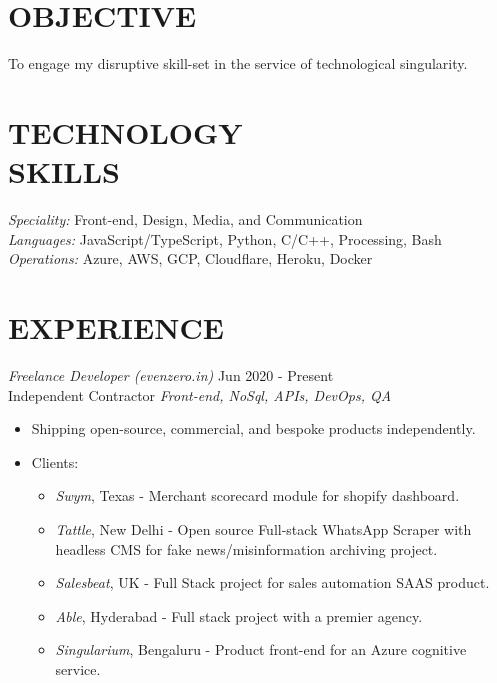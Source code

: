 \documentclass[margin, 10pt]{res} %
\begin{document}
\begin{resume}

\section{OBJECTIVE}  
To engage my disruptive skill-set in the service of technological singularity.

\section{TECHNOLOGY \\ SKILLS} 

{\sl Speciality:} Front-end, Design, Media, and Communication \\
{\sl Languages:} JavaScript/TypeScript, Python, C/C++, Processing, Bash\\
{\sl Operations:} Azure, AWS, GCP, Cloudflare, Heroku, Docker


\section{EXPERIENCE}

{\sl Freelance Developer (evenzero.in)} \hfill Jun 2020 - Present \\
 Independent Contractor \hfill {\scriptsize \it Front-end, NoSql, APIs, DevOps, QA}
\begin{itemize}
\item Shipping open-source, commercial, and bespoke products independently.
\item Clients:
\begin{itemize}
\item {\sl Swym}, Texas - Merchant scorecard module for shopify dashboard.
\item {\sl Tattle}, New Delhi - Open source Full-stack WhatsApp Scraper with headless CMS for fake news/misinformation archiving project. 
\item {\sl Salesbeat}, UK - Full Stack project for sales automation SAAS product.
\item {\sl Able}, Hyderabad - Full stack project with a premier agency.
\item {\sl Singularium}, Bengaluru - Product front-end for an Azure cognitive service.
\end{itemize}
\end{itemize}


\end{resume}
\end{document}
